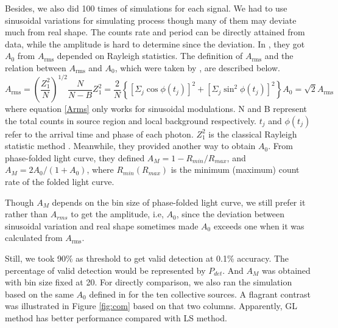 \documentclass[twoside,twocolumn]{aastex63}
\begin{document}
Besides, we also did 100 times of simulations for each signal. We had to use sinusoidal variations for simulating process though many of them may deviate much from real shape. The counts rate and period can be directly attained from data, while the amplitude is hard to determine since the deviation. In \citet{2012ApJ...746..165H}, they got $A_0$ from $A_{\mathrm{rms}}$ depended on Rayleigh statistics.
The definition of $A_{\mathrm{rms}}$ and the relation between 
$A_{\mathrm{rms}}$ and $A_0$, which were taken by \cite{2012ApJ...746..165H}, are described below.
\begin{subequations}
\begin{equation}
A_{\mathrm{rms}}=\left(\frac{Z_{1}^{2}}{N}\right)^{1 / 2} \frac{N}{N-B}
\end{equation}
\begin{equation}
Z_{1}^{2}=\frac{2}{N}\left\{\left[\Sigma_{j} \cos \phi\left(t_{j}\right)\right]^{2}+\left[\Sigma_{j} \sin ^{2} \phi\left(t_{j}\right)\right]^{2}\right\}
\end{equation}
\begin{equation}\label{Arms}
A_0=\sqrt{2} A_{\mathrm{rms}}
\end{equation}
\end{subequations}
where equation \ref{Arms} only works for sinusoidal modulations. N and B represent the total counts in source region and local background respectively. $t_{j}$ and $\phi\left(t_{j}\right)$ refer to the arrival time and phase of each photon. $Z_{1}^{2}$ is the classical Rayleigh statistic method \citep{1983A&A...128..245B,2003ApJ...599..465M}.
Meanwhile, they provided another way to obtain $A_0$. From phase-folded light curve, they defined $A_{M}={1-R_{min}}/R_{max}$, and $A_{M}=2A_0/({1+A_0})$, where $R_{min}(R_{max})$ is the minimum (maximum) count rate of the folded light curve. 

Though $A_{M}$ depends on the bin size of phase-folded light curve, we still prefer it rather than $A_{rms}$ to get the amplitude, i.e, $A_0$, since the deviation between sinusoidal variation and real shape sometimes made $A_{0}$ exceeds one when it was calculated from $A_{\mathrm{rms}}$. 

Still, we took 90\% as threshold to get valid detection at 0.1\% accuracy. The percentage of valid detection would be represented by $P_{det}$. And $A_{M}$ was obtained with bin size fixed at 20. For directly comparison, we also ran the simulation based on the same $A_{0}$ defined in \citet{2012ApJ...746..165H} for the ten collective sources. A flagrant contrast was illustrated in Figure \ref{fig:com} based on that two columns. Apparently, GL method has better performance compared with LS method.
\end{document}
